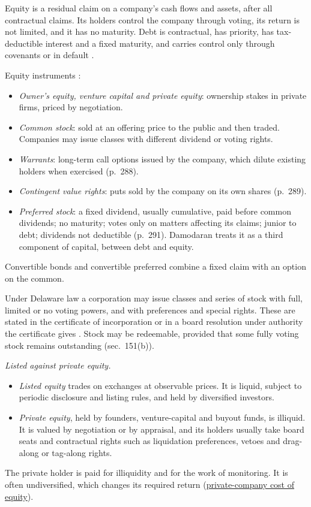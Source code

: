 \begin{qfdefinition}\label{def:equity-instruments}
 Equity is a residual claim on a company's cash flows and assets, after all contractual claims. Its holders control the company through voting, its return is not limited, and it has no maturity. Debt is contractual, has priority, has tax-deductible interest and a fixed maturity, and carries control only through covenants or in default \citep[pp.~285--286]{applied-corporate-finance-2014}.

Equity instruments \citep[pp.~286--291]{applied-corporate-finance-2014}:
\begin{itemize}
\item \emph{Owner's equity, venture capital and private equity}: ownership stakes in private firms, priced by negotiation.
\item \emph{Common stock}: sold at an offering price to the public and then traded. Companies may issue classes with different dividend or voting rights.
\item \emph{Warrants}: long-term call options issued by the company, which dilute existing holders when exercised (p.~288).
\item \emph{Contingent value rights}: puts sold by the company on its own shares (p.~289).
\item \emph{Preferred stock}: a fixed dividend, usually cumulative, paid before common dividends; no maturity; votes only on matters affecting its claims; junior to debt; dividends not deductible (p.~291). Damodaran treats it as a third component of capital, between debt and equity.
\end{itemize}
Convertible bonds and convertible preferred combine a fixed claim with an option on the common.

Under Delaware law a corporation may issue classes and series of stock with full, limited or no voting powers, and with preferences and special rights. These are stated in the certificate of incorporation or in a board resolution under authority the certificate gives \citep[sec.~151(a)]{delaware-gcl-2026}. Stock may be redeemable, provided that some fully voting stock remains outstanding (sec.~151(b)).

\emph{Listed against private equity.}
\begin{itemize}
\item \emph{Listed equity} trades on exchanges at observable prices. It is liquid, subject to periodic disclosure and listing rules, and held by diversified investors.
\item \emph{Private equity}, held by founders, venture-capital and buyout funds, is illiquid. It is valued by negotiation or by appraisal, and its holders usually take board seats and contractual rights such as liquidation preferences, vetoes and drag-along or tag-along rights.
\end{itemize}
The private holder is paid for illiquidity and for the work of monitoring. It is often undiversified, which changes its required return (\hyperref[meth:cost-of-debt-equity-estimation]{private-company cost of equity}).


\end{qfdefinition}

